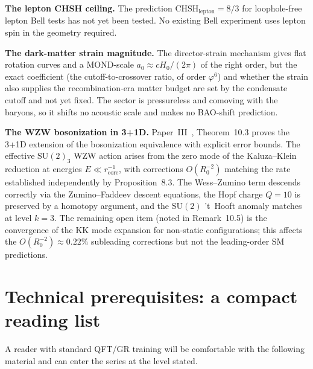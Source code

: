 \documentclass[11pt,a4paper]{article}
\newcommand{\vp}{\varphi}
\newcommand{\CHSH}{\mathrm{CHSH}}
\begin{document}
\textbf{The lepton CHSH ceiling.} The prediction $\CHSH_{\mathrm{lepton}} = 8/3$
for loophole-free lepton Bell tests has not yet been tested. No existing Bell
experiment uses lepton spin in the geometry required.

\textbf{The dark-matter strain magnitude.} The director-strain mechanism gives
flat rotation curves and a MOND-scale $a_0\approx cH_0/(2\pi)$ of the right
order, but the exact coefficient (the cutoff-to-crossover ratio, of order
$\vp^6$) and whether the strain also supplies the recombination-era matter
budget are set by the condensate cutoff and not yet fixed. The sector is
pressureless and comoving with the baryons, so it shifts no acoustic scale and
makes no BAO-shift prediction.

\textbf{The WZW bosonization in 3+1D.}
Paper~III~\cite{Paper3}, Theorem~10.3
proves the 3+1D extension of the bosonization equivalence with explicit
error bounds. The effective $\mathrm{SU}(2)_3$ WZW action arises from the
zero mode of the Kaluza--Klein reduction at energies $E\ll r_{\mathrm{core}}^{-1}$,
with corrections $O(R_0^{-2})$ matching the rate established independently
by Proposition~8.3.
The Wess--Zumino term descends correctly via the Zumino--Faddeev descent
equations, the Hopf charge $Q=10$ is preserved by a homotopy argument,
and the $\mathrm{SU}(2)$ 't~Hooft anomaly matches at level $k=3$.
The remaining open item (noted in Remark~10.5)
is the convergence of the KK mode expansion for non-static configurations;
this affects the $O(R_0^{-2})\approx0.22\%$ subleading corrections
but not the leading-order SM predictions.

\section{Technical prerequisites: a compact reading list}

A reader with standard QFT/GR training will be comfortable with the following
material and can enter the series at the level stated.
\end{document}
